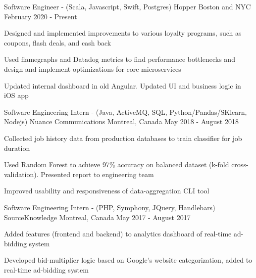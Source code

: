 


\begin{cventries}


\cventry
  {Software Engineer - (Scala, Javascript, Swift, Postgres)} %
  {Hopper} %
  {Boston and NYC} %
  {February 2020 - Present} %
  { %
    \begin{cvitems}
    \item {Designed and implemented improvements to various loyalty programs, such as coupons, flash deals, and cash back}
    \item {Used flamegraphs and Datadog metrics to find performance bottlenecks and design and implement optimizations for core microservices}
    \item {Updated internal dashboard in old Angular. Updated UI and business logic in iOS app}
    \end{cvitems}
  }


\cventry
{Software Engineering Intern - (Java, ActiveMQ, SQL, Python/Pandas/SKlearn, Nodejs)} %
{Nuance Communications} %
{Montreal, Canada} %
{May 2018 - August 2018} %
{ %
\begin{cvitems}
\item {Collected job history data from production databases to train classifier for job duration}
\item {Used Random Forest to achieve 97\% accuracy on balanced dataset (k-fold cross-validation). Presented report to engineering team}
\item {Improved usability and responsiveness of data-aggregation CLI tool}
\end{cvitems}
}


\cventry
{Software Engineering Intern - (PHP, Symphony, JQuery, Handlebars)} %
{SourceKnowledge} %
{Montreal, Canada} %
{May 2017 - August 2017} %
{ %
\begin{cvitems}
\item {Added features (frontend and backend) to analytics dashboard of real-time ad-bidding system}
\item {Developed bid-multiplier logic based on Google's website categorization, added to real-time ad-bidding system}
\end{cvitems}
}


\end{cventries}
